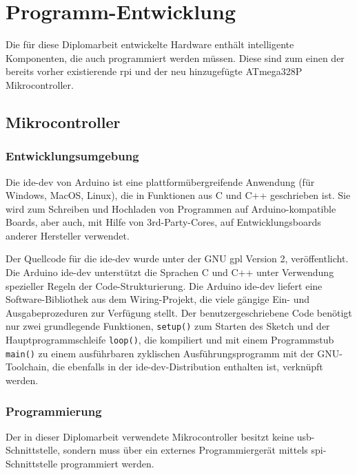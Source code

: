 \section{Programm-Entwicklung}
Die für diese Diplomarbeit entwickelte Hardware enthält intelligente Komponenten, die auch programmiert werden müssen.
Diese sind zum einen der bereits vorher existierende \ac{rpi} und der neu hinzugefügte ATmega328P Mikrocontroller.
\subsection{Mikrocontroller}
\subsubsection{Entwicklungsumgebung}
Die \ac{ide-dev} von Arduino ist eine plattformübergreifende Anwendung (für Windows, MacOS, Linux), die in Funktionen aus C und C++ geschrieben ist.
Sie wird zum Schreiben und Hochladen von Programmen auf Arduino-kompatible Boards, aber auch, mit Hilfe von 3rd-Party-Cores, auf Entwicklungsboards anderer Hersteller verwendet.

Der Quellcode für die \ac{ide-dev} wurde unter der GNU \ac{gpl} Version 2, veröffentlicht.
Die Arduino \ac{ide-dev} unterstützt die Sprachen C und C++ unter Verwendung spezieller Regeln der Code-Strukturierung.
Die Arduino \ac{ide-dev} liefert eine Software-Bibliothek aus dem Wiring-Projekt, die viele gängige Ein- und Ausgabeprozeduren zur Verfügung stellt.
Der benutzergeschriebene Code benötigt nur zwei grundlegende Funktionen, \texttt{setup()} zum Starten des Sketch und der Hauptprogrammschleife \texttt{loop()}, die kompiliert und mit einem Programmstub \texttt{main()} zu einem ausführbaren zyklischen Ausführungsprogramm mit der GNU-Toolchain, die ebenfalls in der \ac{ide-dev}-Distribution enthalten ist, verknüpft werden.

\subsubsection{Programmierung}
Der in dieser Diplomarbeit verwendete Mikrocontroller besitzt keine \ac{usb}-Schnittstelle, sondern muss über ein externes Programmiergerät mittels \ac{spi}-Schnittstelle programmiert werden.

